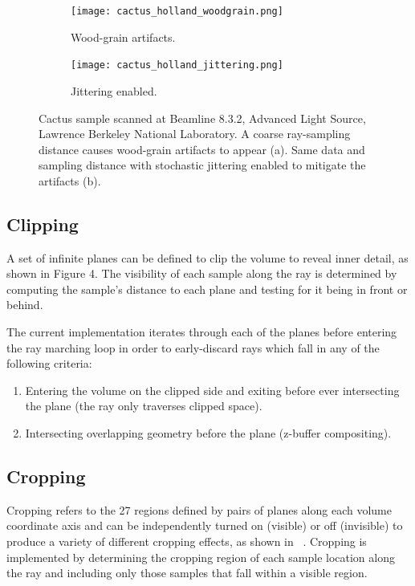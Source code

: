 \begin{figure}[htb]
\centering
  \begin{subfigure}[b]{.5\columnwidth}
    \centering
    \texttt{[image: cactus\_holland\_woodgrain.png]}
    \caption{Wood-grain artifacts.}
    \label{fig:jittering_without}
  \end{subfigure}%
  \begin{subfigure}[b]{.5\columnwidth}
    \centering
    \texttt{[image: cactus\_holland\_jittering.png]}
    \caption{Jittering enabled.}
    \label{fig:jittering_with}
  \end{subfigure}
  \caption{Cactus sample scanned at Beamline 8.3.2, Advanced Light Source,
  Lawrence Berkeley National Laboratory. A coarse ray-sampling distance causes
  wood-grain artifacts to appear (a). Same data and sampling distance with
  stochastic jittering enabled to mitigate the artifacts (b).}
  \label{fig:jittering}
\end{figure}

\subsection{Clipping}
\label{clipping}
A set of infinite planes can be defined to clip the volume to reveal inner
detail, as shown in Figure 4.  The visibility of each sample along the ray
is determined by computing the sample's distance to each plane and testing
for it being in front or behind.

The current implementation iterates through each of the planes before entering
the ray marching loop in order to early-discard rays which fall in any of the
following criteria:

\begin{enumerate}
\item Entering the volume on the clipped side and exiting before ever
  intersecting the plane (the ray only traverses clipped space).
\item Intersecting overlapping geometry before the plane (z-buffer compositing).
\end{enumerate}

\subsection{Cropping} Cropping refers to the 27 regions defined by pairs of
planes along each volume coordinate axis and can be independently turned
on (visible) or off (invisible) to produce a variety of different cropping
effects, as shown in ~. Cropping is implemented by
determining the cropping region of each sample location along the ray and
including only those samples that fall within a visible region.

